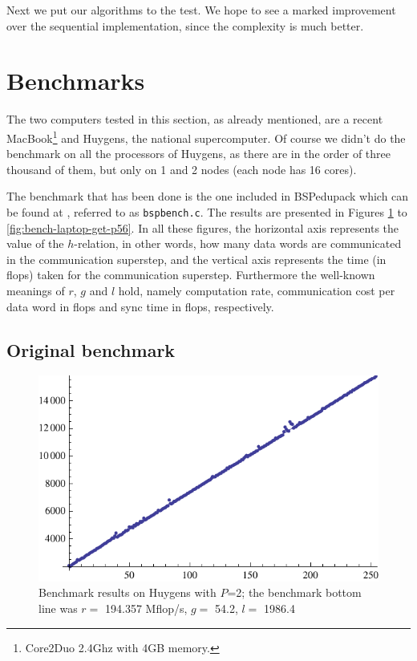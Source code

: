 \documentclass[a4paper]{article}
\begin{document}
Next we put our algorithms to the test. We hope to see a marked improvement over
the sequential implementation, since the complexity is much better. 


\section{Benchmarks}

The two computers tested in this section, as already mentioned, are a recent
MacBook\footnote{Core2Duo 2.4Ghz with 4GB memory.} and Huygens, the national
supercomputer. Of course we didn't do the benchmark on all the processors of Huygens,
as there are in the order of three thousand of them, but only on 1 and 2 nodes
(each node has 16 cores). 

The benchmark that has been done is the one included in BSPedupack which can be
found at \cite{edupack}, referred to as \texttt{bspbench.c}. The results are
presented in Figures \ref{fig:bench-huy-put-p2} to
\ref{fig:bench-laptop-get-p56}. In all these figures, the horizontal axis
represents the value of the $h$-relation, in other words, how many data words
are communicated in the communication superstep, and the vertical axis
represents the time (in flops) taken for the communication superstep.
Furthermore the well-known meanings of $r$, $g$ and $l$ hold, namely computation
rate, communication cost per data word in flops and sync time in flops,
respectively. 

\subsection{Original benchmark}
\begin{figure}[h]
    \begin{center}
        \includegraphics{img/bench-huy-put-p2.pdf}
    \end{center}
    \caption{Benchmark results on Huygens with $P$=2; the benchmark bottom line
    was $r=$ 194.357 Mflop/s, $g=$ 54.2, $l=$ 1986.4}
    \label{fig:bench-huy-put-p2}
\end{figure}
\end{document}
